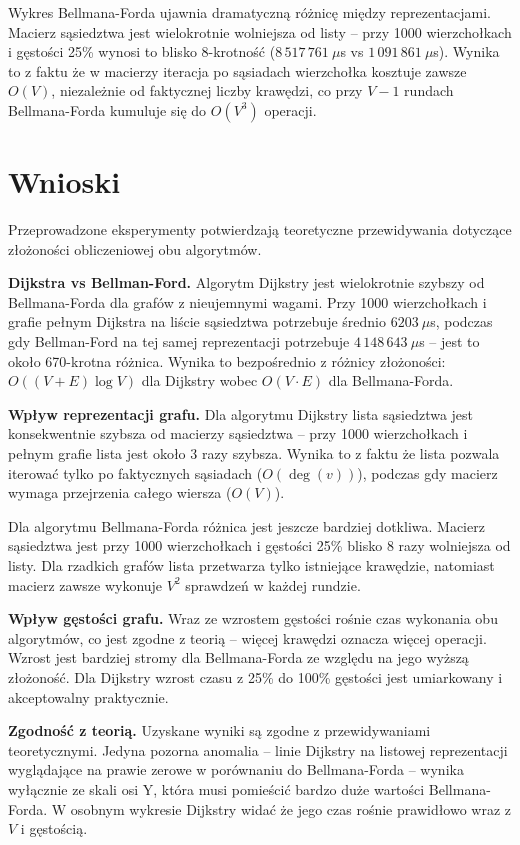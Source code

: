 \documentclass[12pt,a4paper]{article}
\begin{document}
Wykres Bellmana-Forda ujawnia dramatyczną różnicę między reprezentacjami.
Macierz sąsiedztwa jest wielokrotnie wolniejsza od listy -- przy 1000 wierzchołkach
i gęstości 25\% wynosi to blisko 8-krotność ($8\,517\,761\ \mu$s vs $1\,091\,861\ \mu$s).
Wynika to z faktu że w macierzy iteracja po sąsiadach wierzchołka kosztuje zawsze $O(V)$,
niezależnie od faktycznej liczby krawędzi, co przy $V-1$ rundach Bellmana-Forda
kumuluje się do $O(V^3)$ operacji.
 
\section{Wnioski}
 
Przeprowadzone eksperymenty potwierdzają teoretyczne przewidywania dotyczące
złożoności obliczeniowej obu algorytmów.
 
\textbf{Dijkstra vs Bellman-Ford.}
Algorytm Dijkstry jest wielokrotnie szybszy od Bellmana-Forda dla grafów
z nieujemnymi wagami. Przy 1000 wierzchołkach i grafie pełnym Dijkstra
na liście sąsiedztwa potrzebuje średnio $6203\ \mu$s, podczas gdy
Bellman-Ford na tej samej reprezentacji potrzebuje $4\,148\,643\ \mu$s --
jest to około 670-krotna różnica. Wynika to bezpośrednio z różnicy
złożoności: $O((V+E)\log V)$ dla Dijkstry wobec $O(V \cdot E)$ dla
Bellmana-Forda.
 
\textbf{Wpływ reprezentacji grafu.}
Dla algorytmu Dijkstry lista sąsiedztwa jest konsekwentnie szybsza od
macierzy sąsiedztwa -- przy 1000 wierzchołkach i pełnym grafie lista jest
około 3 razy szybsza. Wynika to z faktu że lista pozwala iterować tylko
po faktycznych sąsiadach ($O(\deg(v))$), podczas gdy macierz wymaga
przejrzenia całego wiersza ($O(V)$).
 
Dla algorytmu Bellmana-Forda różnica jest jeszcze bardziej dotkliwa.
Macierz sąsiedztwa jest przy 1000 wierzchołkach i gęstości 25\%
blisko 8 razy wolniejsza od listy. Dla rzadkich grafów lista przetwarza
tylko istniejące krawędzie, natomiast macierz zawsze wykonuje $V^2$
sprawdzeń w każdej rundzie.
 
\textbf{Wpływ gęstości grafu.}
Wraz ze wzrostem gęstości rośnie czas wykonania obu algorytmów, co jest
zgodne z teorią -- więcej krawędzi oznacza więcej operacji. Wzrost jest
bardziej stromy dla Bellmana-Forda ze względu na jego wyższą złożoność.
Dla Dijkstry wzrost czasu z 25\% do 100\% gęstości jest umiarkowany
i akceptowalny praktycznie.
 
\textbf{Zgodność z teorią.}
Uzyskane wyniki są zgodne z przewidywaniami teoretycznymi. Jedyna
pozorna anomalia -- linie Dijkstry na listowej reprezentacji wyglądające
na prawie zerowe w porównaniu do Bellmana-Forda -- wynika wyłącznie
ze skali osi Y, która musi pomieścić bardzo duże wartości Bellmana-Forda.
W osobnym wykresie Dijkstry widać że jego czas rośnie prawidłowo wraz
z $V$ i gęstością.
 
\end{document}
